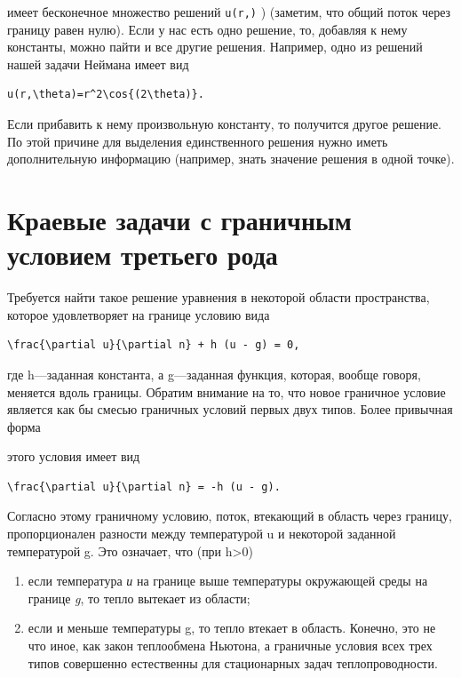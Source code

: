\documentclass[
  ukrainian,
]{article}
\begin{document}
имеет бесконечное множество решений \texttt{u(r,)} \theta) (заметим, что
общий поток через границу равен нулю). Если у нас есть одно решение, то,
добавляя к нему константы, можно пайти и все другие решения. Например,
одно из решений нашей задачи Неймана имеет вид

\begin{verbatim}
u(r,\theta)=r^2\cos{(2\theta)}.
\end{verbatim}

Если прибавить к нему произвольную константу, то получится другое
решение. По этой причине для выделения единственного решения нужно иметь
дополнительную информацию (например, знать значение решения в одной
точке).

\section{\texorpdfstring{\textbf{Краевые задачи с граничным условием}
третьего
рода}{Краевые задачи с граничным условием третьего рода}}\label{ux43aux440ux430ux435ux432ux44bux435-ux437ux430ux434ux430ux447ux438-ux441-ux433ux440ux430ux43dux438ux447ux43dux44bux43c-ux443ux441ux43bux43eux432ux438ux435ux43c-ux442ux440ux435ux442ux44cux435ux433ux43e-ux440ux43eux434ux430}

Требуется найти такое решение уравнения в некоторой области
пространства, которое удовлетворяет на границе условию вида

\begin{verbatim}
\frac{\partial u}{\partial n} + h (u - g) = 0,
\end{verbatim}

где h---заданная константа, а g---заданная функция, которая, вообще
говоря, меняется вдоль границы. Обратим внимание на то, что новое
граничное условие является как бы смесью граничных условий первых двух
типов. Более привычная форма

этого условия имеет вид

\begin{verbatim}
\frac{\partial u}{\partial n} = -h (u - g).
\end{verbatim}

Согласно этому граничному условию, поток, втекающий в область через
границу, пропорционален разности между температурой u и некоторой
заданной температурой g. Это означает, что (при h\textgreater0)

\begin{enumerate}
\def\labelenumi{\arabic{enumi})}
\item
  если температура \emph{и} на границе выше температуры окружающей среды
  на границе \emph{g}, то тепло вытекает из области;
\item
  если и меньше температуры g, то тепло втекает в область. Конечно, это
  не что иное, как закон теплообмена Ньютона, а граничные условия всех
  трех типов совершенно естественны для стационарных задач
  теплопроводности.
\end{enumerate}
\end{document}
